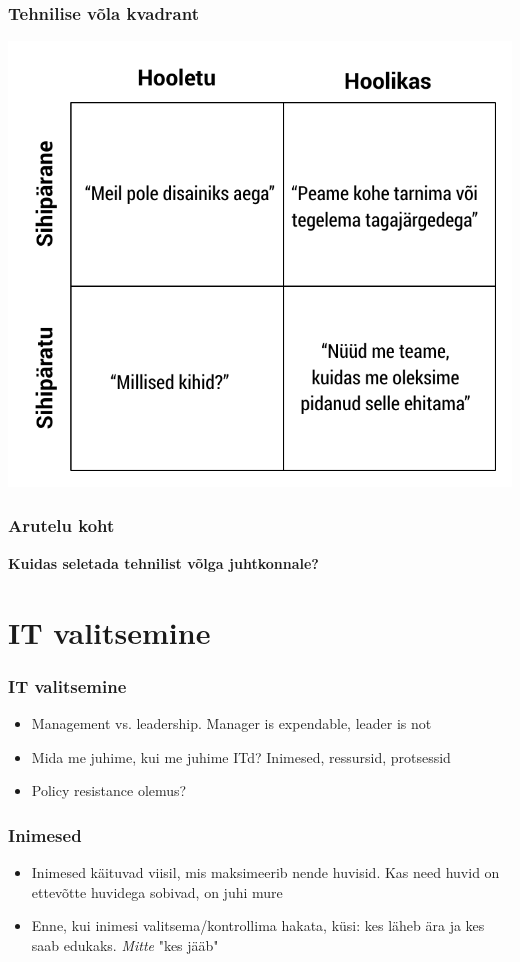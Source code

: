 \begin{frame}[fragile]
  \frametitle{Tehnilise võla kvadrant}
  	\begin{center}
			\includegraphics[width=.65\textwidth]{fowler.pdf}
	\end{center}
	\cite{fowlerdebt}
\end{frame}

\begin{frame}[fragile]
  \frametitle{Arutelu koht}
		\begin{center}
			\textbf{Kuidas seletada tehnilist võlga juhtkonnale?}
		\end{center}
\end{frame}

\section{IT valitsemine}
\begin{frame}[fragile]
  \frametitle{IT valitsemine}
	\begin{itemize}
		\item Management vs. leadership. Manager is expendable, leader is not
		\item Mida me juhime, kui me juhime ITd? Inimesed, ressursid, protsessid
		\item Policy resistance olemus?
	\end{itemize}
\end{frame}

\begin{frame}[fragile]
  \frametitle{Inimesed}
	\begin{itemize}
		\item Inimesed käituvad viisil, mis maksimeerib nende huvisid. Kas need huvid on ettevõtte huvidega sobivad, on juhi mure
		\item Enne, kui inimesi valitsema/kontrollima hakata, küsi: kes läheb ära ja kes saab edukaks. \emph{Mitte} "kes jääb" 
	\end{itemize}
\end{frame}


